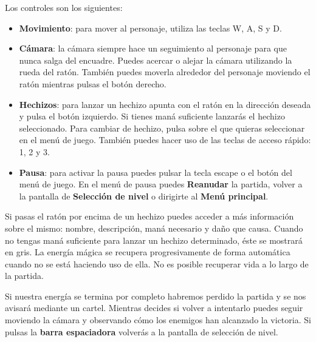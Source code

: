 
Los controles son los siguientes:

\begin{itemize}
    \itemsep0em
    \item \textbf{Movimiento}: para mover al personaje, utiliza las teclas W, A, S y D.
    \item \textbf{Cámara}: la cámara siempre hace un seguimiento al personaje
    para que nunca salga del encuadre. Puedes acercar o alejar la cámara
    utilizando la rueda del ratón. También puedes moverla alrededor del
    personaje moviendo el ratón mientras pulsas el botón derecho.
    \item \textbf{Hechizos}: para lanzar un hechizo apunta con el ratón
    en la dirección deseada y pulsa el botón izquierdo. Si tienes maná suficiente
    lanzarás el hechizo seleccionado. Para cambiar de hechizo, pulsa
    sobre el que quieras seleccionar en el menú de juego. También puedes
    hacer uso de las teclas de acceso rápido: 1, 2 y 3.
    \item \textbf{Pausa}: para activar la pausa puedes pulsar la tecla
    escape o el botón del menú de juego. En el menú de pausa puedes \textbf{Reanudar}
    la partida, volver a la pantalla de \textbf{Selección de nivel} o dirigirte
    al \textbf{Menú principal}.
\end{itemize}

Si pasas el ratón por encima de un hechizo puedes acceder a más información
sobre el mismo: nombre, descripción, maná necesario y daño que causa. Cuando
no tengas maná suficiente para lanzar un hechizo determinado, éste se mostrará
en gris. La energía mágica se recupera progresivamente de forma automática
cuando no se está haciendo uso de ella. No es posible recuperar vida a lo largo
de la partida.


Si nuestra energía se termina por completo habremos perdido la partida y se
nos avisará mediante un cartel. Mientras decides si volver a intentarlo
puedes seguir moviendo la cámara y observando cómo los enemigos han alcanzado
la victoria. Si pulsas la \textbf{barra espaciadora} volverás a la pantalla
de selección de nivel.


